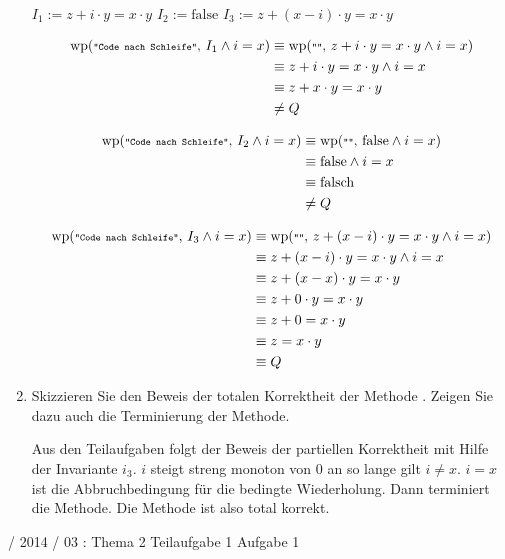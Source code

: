 \documentclass{lehramt-informatik}
\def\wp#1#2{
  \text{wp}(\texttt{\scriptsize"#1"},\thinspace #2)
}
\begin{document}
\begin{enumerate}
\begin{antwort}

$I_1 := z + i \cdot y = x \cdot y$
$I_2 := \text{false}$
$I_3 := z + (x - i) \cdot y = x \cdot y$

\begin{align*}
\wp{Code nach Schleife}{I_1 \land i = x}
& \equiv \wp{}{z + i \cdot y = x \cdot y \land i = x} \\
& \equiv z + i \cdot y = x \cdot y \land i = x \\
& \equiv z + x \cdot y = x \cdot y\\
& \neq Q
\end{align*}

\begin{align*}
\wp{Code nach Schleife}{I_2 \land i = x}
& \equiv \wp{}{\text{false} \land i = x} \\
& \equiv \text{false} \land i = x \\
& \equiv \text{falsch} \\
& \neq Q
\end{align*}

\begin{align*}
\wp{Code nach Schleife}{I_3 \land i = x}
& \equiv \wp{}{z + (x - i) \cdot y = x \cdot y \land i = x} \\
& \equiv z + (x - i) \cdot y = x \cdot y \land i = x \\
& \equiv z + (x - x) \cdot y = x \cdot y\\
& \equiv z + 0 \cdot y = x \cdot y\\
& \equiv z + 0 = x \cdot y \\
& \equiv z = x \cdot y \\
& \equiv Q \\
\end{align*}

\end{antwort}


\item Skizzieren Sie den Beweis der totalen Korrektheit der Methode
. Zeigen Sie dazu auch die Terminierung der Methode.

\begin{antwort}
Aus den Teilaufgaben folgt der Beweis der partiellen Korrektheit mit
Hilfe der Invariante $i_3$. $i$ steigt streng monoton von $0$ an so
lange gilt $i \neq x$. $i = x$ ist die Abbruchbedingung für die bedingte
Wiederholung. Dann terminiert die Methode. Die Methode  ist
also total korrekt.
\end{antwort}

\end{enumerate}

%

 / 2014 / 03 : Thema 2 Teilaufgabe 1 Aufgabe 1

\literatur
\end{document}
